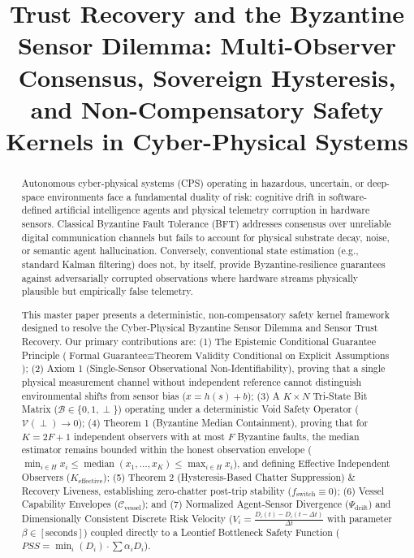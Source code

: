 \documentclass[conference]{IEEEtran}
\begin{document}
\title{Trust Recovery and the Byzantine Sensor Dilemma: Multi-Observer Consensus, Sovereign Hysteresis, and Non-Compensatory Safety Kernels in Cyber-Physical Systems\\
}

\author{
}

\maketitle

\begin{abstract}
Autonomous cyber-physical systems (CPS) operating in hazardous, uncertain, or deep-space environments face a fundamental duality of risk: cognitive drift in software-defined artificial intelligence agents and physical telemetry corruption in hardware sensors. Classical Byzantine Fault Tolerance (BFT) addresses consensus over unreliable digital communication channels but fails to account for physical substrate decay, noise, or semantic agent hallucination. Conversely, conventional state estimation (e.g., standard Kalman filtering) does not, by itself, provide Byzantine-resilience guarantees against adversarially corrupted observations where hardware streams physically plausible but empirically false telemetry.

This master paper presents a deterministic, non-compensatory safety kernel framework designed to resolve the Cyber-Physical Byzantine Sensor Dilemma and Sensor Trust Recovery. Our primary contributions are: (1) The Epistemic Conditional Guarantee Principle ($\text{Formal Guarantee} \equiv \text{Theorem Validity Conditional on Explicit Assumptions}$); (2) Axiom 1 (Single-Sensor Observational Non-Identifiability), proving that a single physical measurement channel without independent reference cannot distinguish environmental shifts from sensor bias ($x = h(s) + b$); (3) A $K \times N$ Tri-State Bit Matrix ($\mathcal{B} \in \{0, 1, \perp\}$) operating under a deterministic Void Safety Operator ($\mathcal{V}(\perp) \to 0$); (4) Theorem 1 (Byzantine Median Containment), proving that for $K = 2F + 1$ independent observers with at most $F$ Byzantine faults, the median estimator remains bounded within the honest observation envelope ($\min_{i \in H} x_i \le \operatorname{median}(x_1, \dots, x_K) \le \max_{i \in H} x_i$), and defining Effective Independent Observers ($K_{\text{effective}}$); (5) Theorem 2 (Hysteresis-Based Chatter Suppression) \& Recovery Liveness, establishing zero-chatter post-trip stability ($f_{\text{switch}} \equiv 0$); (6) Vessel Capability Envelopes ($\mathcal{C}_{\text{vessel}}$); and (7) Normalized Agent-Sensor Divergence ($\Psi_{\text{drift}}$) and Dimensionally Consistent Discrete Risk Velocity ($V_i = \frac{D_i(t) - D_i(t-\Delta t)}{\Delta t}$ with parameter $\beta \in [\text{seconds}]$) coupled directly to a Leontief Bottleneck Safety Function ($PSS = \min_i(D_i) \cdot \sum \alpha_i D_i$).


\end{abstract}
\end{document}
